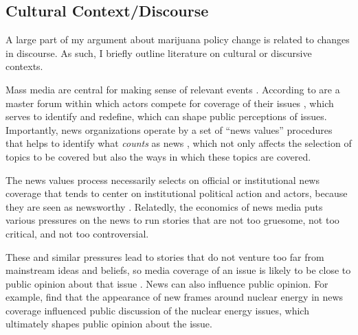 



\subsection{Cultural Context/Discourse}

A large part of my argument about marijuana policy change is related to changes in discourse. As such, I briefly outline literature on cultural or discursive contexts. 

Mass media are central for making sense of relevant events \citep{gamson_and_modigliani_1989}. According to \citet{ferree_et_al_2002} are a master forum within which actors compete for coverage of their issues \citep{amenta_et_al_2012}, which serves to identify and redefine, which can shape public perceptions of issues. Importantly, news organizations operate by a set of ``news values'' procedures that helps to identify what \textit{counts} as news \citep{amenta_et_al_2012,galtung_and_ruge_1965}, which not only affects the selection of topics to be covered \citep{galtung_and_ruge_1965} but also the ways in which these topics are covered.

The news values process necessarily selects on official or institutional news coverage \citep{schudson_2002,gitlin_1980,gans_1979} that tends to center on institutional political action and actors, because they are seen as newsworthy \citep{amenta_et_al_2012}. Relatedly, the economics of news media puts various pressures on the news to run stories that are not too gruesome, not too critical, and not too controversial. 

These and similar pressures lead to stories that do not venture too far from mainstream ideas and beliefs, so media coverage of an issue is likely to be close to public opinion about that issue \citep{gamson_and_modigliani_1989}. News can also influence public opinion. For example, \citep{gamson_and_modigliani_1989} find that the appearance of new frames around nuclear energy in news coverage influenced public discussion of the nuclear energy issues, which ultimately shapes public opinion about the issue.

